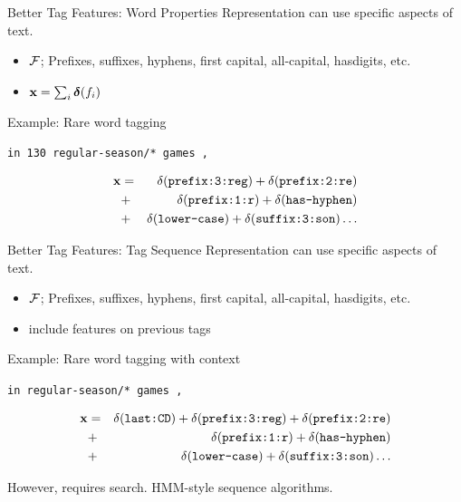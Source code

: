 \documentclass{beamer}
\begin{document}
\begin{frame}{Better Tag Features: Word Properties}
  Representation can use specific aspects of text.
  \begin{itemize}
  \item $\mathcal{F}$; Prefixes, suffixes, hyphens, first capital, all-capital, hasdigits, etc.
  \item $\mathbf{x} = \sum_{i} \boldsymbol{\delta}(f_i)$
  \end{itemize}

  Example: Rare word tagging

  \begin{center}
    \texttt{in 130 \alert{regular-season/*} games ,}
  \end{center}
  \begin{eqnarray*}
    \mathbf{x} &=& \delta(\texttt{prefix:3:reg}) + \delta(\texttt{prefix:2:re}) \\
    &+& \delta(\texttt{prefix:1:r}) + \delta(\texttt{has-hyphen}) \\
    &+& \delta(\texttt{lower-case}) + \delta(\texttt{suffix:3:son}) \ldots
  \end{eqnarray*}
\end{frame}

\begin{frame}{Better Tag Features: Tag Sequence}
  Representation can use specific aspects of text.
  \begin{itemize}
  \item $\mathcal{F}$; Prefixes, suffixes, hyphens, first capital, all-capital, hasdigits, etc.
  \item {} include features on previous tags
  \end{itemize}

  Example: Rare word tagging with context

  \begin{center}
    \texttt{in  \alert{regular-season/*} games ,}
  \end{center}
  \begin{eqnarray*}
    \mathbf{x} &=& \delta(\texttt{last:CD}) + \delta(\texttt{prefix:3:reg}) + \delta(\texttt{prefix:2:re}) \\
    &+& \delta(\texttt{prefix:1:r}) + \delta(\texttt{has-hyphen}) \\
    &+& \delta(\texttt{lower-case}) + \delta(\texttt{suffix:3:son}) \ldots
  \end{eqnarray*}

  \alert{However,} requires search. HMM-style sequence algorithms.
\end{frame}
\end{document}
